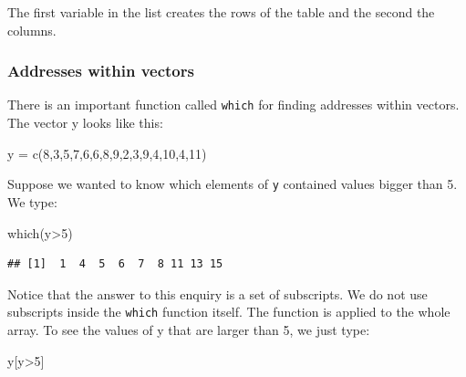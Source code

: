 \documentclass[
]{book}
\newenvironment{Shaded}{\begin{snugshade}}{\end{snugshade}}
\newcommand{\DecValTok}[1]{\textcolor[rgb]{0.00,0.00,0.81}{#1}}
\newcommand{\FunctionTok}[1]{\textcolor[rgb]{0.00,0.00,0.00}{#1}}
\newcommand{\NormalTok}[1]{#1}
\newcommand{\OtherTok}[1]{\textcolor[rgb]{0.56,0.35,0.01}{#1}}
\newcommand{\SpecialCharTok}[1]{\textcolor[rgb]{0.00,0.00,0.00}{#1}}
\begin{document}
The first variable in the list creates the rows of the table and the second the columns.

\hypertarget{addresses-within-vectors}{%
\subsubsection{Addresses within vectors}\label{addresses-within-vectors}}

There is an important function called \texttt{which} for finding addresses within vectors. The vector y looks like this:

\begin{Shaded}
\begin{Highlighting}[]
\NormalTok{y }\OtherTok{=} \FunctionTok{c}\NormalTok{(}\DecValTok{8}\NormalTok{,}\DecValTok{3}\NormalTok{,}\DecValTok{5}\NormalTok{,}\DecValTok{7}\NormalTok{,}\DecValTok{6}\NormalTok{,}\DecValTok{6}\NormalTok{,}\DecValTok{8}\NormalTok{,}\DecValTok{9}\NormalTok{,}\DecValTok{2}\NormalTok{,}\DecValTok{3}\NormalTok{,}\DecValTok{9}\NormalTok{,}\DecValTok{4}\NormalTok{,}\DecValTok{10}\NormalTok{,}\DecValTok{4}\NormalTok{,}\DecValTok{11}\NormalTok{)}
\end{Highlighting}
\end{Shaded}

Suppose we wanted to know which elements of \texttt{y} contained values bigger than 5. We type:

\begin{Shaded}
\begin{Highlighting}[]
\FunctionTok{which}\NormalTok{(y}\SpecialCharTok{\textgreater{}}\DecValTok{5}\NormalTok{)}
\end{Highlighting}
\end{Shaded}

\begin{verbatim}
## [1]  1  4  5  6  7  8 11 13 15
\end{verbatim}

Notice that the answer to this enquiry is a set of subscripts. We do not use subscripts inside the \texttt{which} function itself. The function is applied to the whole array. To see the values of y that are larger than 5, we just type:

\begin{Shaded}
\begin{Highlighting}[]
\NormalTok{y[y}\SpecialCharTok{\textgreater{}}\DecValTok{5}\NormalTok{]}
\end{Highlighting}
\end{Shaded}
\end{document}
